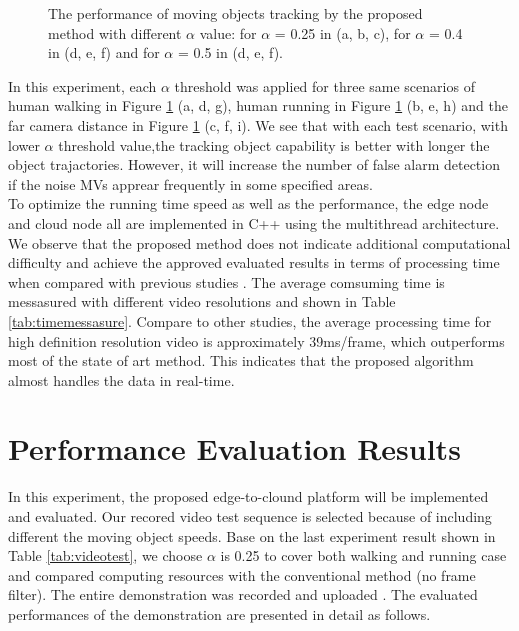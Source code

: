 \begin{figure}
{}
\caption{The performance of moving objects tracking by the proposed method with different $\alpha$ value: for $\alpha$ = 0.25 in (a, b, c), for $\alpha$ = 0.4 in (d, e, f) and for $\alpha$ = 0.5 in (d, e, f).}
\label{fig:objecttracking}
\end{figure}
In this experiment, each $\alpha$ threshold was applied for three same scenarios of human walking in Figure \ref{fig:objecttracking} (a, d, g), human running in Figure \ref{fig:objecttracking} (b, e, h) and the far camera distance in Figure \ref{fig:objecttracking} (c, f, i).  We see that with each test scenario, with lower $\alpha$ threshold value,the tracking object capability is better with longer the object trajactories. However, it will increase the number of false alarm detection if the noise MVs apprear frequently in some specified areas.\\ To optimize the running time speed as well as the performance, the edge node and cloud node all are implemented in C++ using the multithread architecture. We observe that the proposed method does not indicate additional computational difficulty and achieve the approved evaluated results in terms of processing time when compared with previous studies \cite{bombardelli2018efficient} \cite{khatoonabadi2012video}. The average comsuming time  is messasured with different video resolutions and shown in Table \ref{tab:timemessasure}. Compare to other studies, the average processing time for high definition resolution video is approximately 39ms/frame, which outperforms most of the state of art method. This indicates that the proposed algorithm almost handles the data in real-time. 

\section{Performance Evaluation Results}
 In this experiment, the proposed edge-to-clound platform will be implemented and evaluated. Our recored video test sequence is selected because of including different the moving object speeds. Base on the last experiment result shown in Table \ref{tab:videotest}, we choose  $\alpha$ is 0.25 to cover both walking and running case and compared computing resources with the conventional method (no frame filter). The entire demonstration was recorded and uploaded \cite{source}. The evaluated performances of the demonstration are presented in detail as follows.
 
